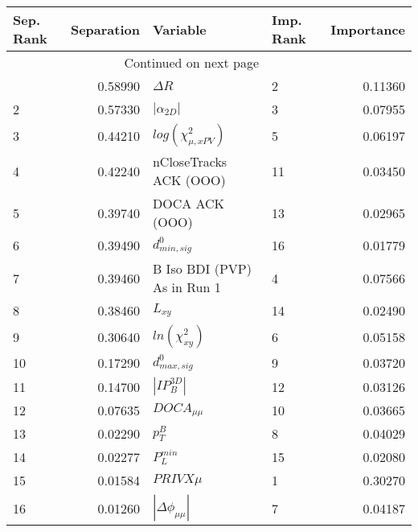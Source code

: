 \usepackage{lscape}

\begin{landscape}
\begin{longtable}{lrllr}
\toprule
Sep. Rank &  Separation &                     Variable & Imp. Rank &  Importance \\
\midrule
\endhead
\midrule
\multicolumn{3}{r}{{Continued on next page}} \\
\midrule
\endfoot

\bottomrule
\endlastfoot
        1 &     0.58990 &                   $\Delta R$ &         2 &     0.11360 \\
        2 &     0.57330 &              $|\alpha_{2D}|$ &         3 &     0.07955 \\
        3 &     0.44210 &    $log(\chi^{2}_{\mu,xPV})$ &         5 &     0.06197 \\
        4 &     0.42240 &       nCloseTracks ACK (OOO) &        11 &     0.03450 \\
        5 &     0.39740 &               DOCA ACK (OOO) &        13 &     0.02965 \\
        6 &     0.39490 &             $d^0_{min, sig}$ &        16 &     0.01779 \\
        7 &     0.39460 &  B Iso BDI (PVP) As in Run 1 &         4 &     0.07566 \\
        8 &     0.38460 &                     $L_{xy}$ &        14 &     0.02490 \\
        9 &     0.30640 &          $ln(\chi^{2}_{xy})$ &         6 &     0.05158 \\
       10 &     0.17290 &             $d^0_{max, sig}$ &         9 &     0.03720 \\
       11 &     0.14700 &              $|IP_{B}^{3D}|$ &        12 &     0.03126 \\
       12 &     0.07635 &              $DOCA_{\mu\mu}$ &        10 &     0.03665 \\
       13 &     0.02290 &                    $p^B_{T}$ &         8 &     0.04029 \\
       14 &     0.02277 &                $P^{min}_{L}$ &        15 &     0.02080 \\
       15 &     0.01584 &                   $PRIVX\mu$ &         1 &     0.30270 \\
       16 &     0.01260 &     $|\Delta \phi_{\mu\mu}|$ &         7 &     0.04187 \\
\end{longtable}

\end{landscape}
